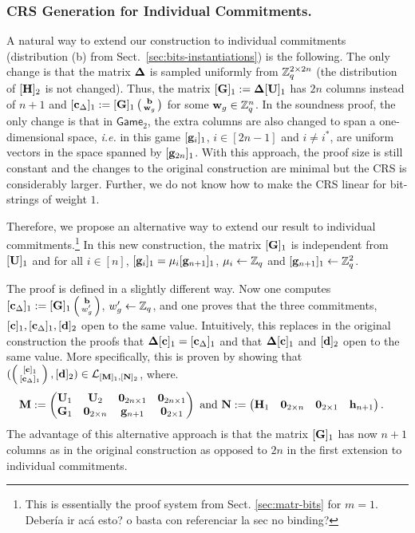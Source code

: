 \subsubsection{CRS Generation for Individual Commitments.}
A natural way to extend our construction to individual commitments (distribution (b) from Sect.\ \ref{sec:bits-instantiations}) is the following. The only change is that the matrix $\mathbf{{\Delta}}$ is sampled uniformly from  $\mathbb{Z}_q^{2 \times 2n}$ (the distribution of $[{\mathbf{{H}}}]_2$ is not changed). Thus, the matrix 
$[\mathbf{{G}}]_1:=\mathbf{{\Delta}} [\mathbf{{U}}]_1$ has $2n$ columns instead of $n+1$ and 
$[\mathbf{c}_{\Delta}]_1 := [\mathbf{{G}}]_1 \left(\begin{smallmatrix}\mathbf{b} \\ \mathbf{w}_g\end{smallmatrix}\right)$ for some $\mathbf{w}_g \in \mathbb{Z}_q^{n}$.   
In the soundness proof, the only change is that in $\mathsf{Game}_2$, the extra columns are also changed to span a one-dimensional space, \textit{i.e.} in this game $[\mathbf{g}_{i}]_1$, $i \in [2n-1]$ and $i \neq i^*$, are uniform vectors in the space spanned by $[\mathbf{g}_{2n}]_1$.
With this approach, the proof size is still constant and the changes to the original construction are minimal but the CRS is considerably larger. Further, we do not know how to make the CRS linear for bit-strings of weight $1$. 

Therefore, we propose an alternative way to extend our result to individual commitments.\footnote{This is essentially the proof system from Sect. \ref{sec:matr-bits} for $m=1$. {\color{red} Deber\'ia ir ac\'a esto? o basta con referenciar la sec no binding?}} In this new construction, the matrix $[\mathbf{{G}}]_1$ is independent from $[\mathbf{{U}}]_1$ and for all $i \in [n]$, $[\mathbf{g}_{i}]_1 = \mu_i [\mathbf{g}_{n+1}]_1$, $\mu_i \gets \mathbb{Z}_q$ and   $[\mathbf{g}_{n+1}]_1\gets\mathbb{Z}_q^2$. 

The proof is defined in a slightly different way. Now one computes $[\mathbf{c}_\Delta]_1:=[\mathbf{{G}}]_1\left(\begin{smallmatrix}\mathbf{b}\\w'_g\end{smallmatrix}\right)$, $w'_g\gets\mathbb{Z}_q$, and one proves that the three commitments, $[\mathbf{c}]_1,[\mathbf{c}_\Delta]_1,[\mathbf{d}]_2$ open to the same value.  Intuitively, this replaces in the original construction the proofs that $\mathbf{{\Delta}}[\mathbf{c}]_1=[\mathbf{c}_\Delta]_1$ and that $\mathbf{{\Delta}}[\mathbf{c}]_1$ and $[\mathbf{d}]_2$ open to the same value. More specifically, this is proven by showing that $(\left(\begin{smallmatrix}{[\mathbf{c}]_1}\\{[\mathbf{c}_\Delta]_1}\end{smallmatrix}\right), [\mathbf{d}]_2)\in\mathcal{L}_{[\mathbf{{M}}]_1,[\mathbf{{N}}]_2}$, where.
\begin{align*}
&\mathbf{{M}} := 
\left(\begin{matrix}
    \mathbf{{U}}_1 & \mathbf{{U}}_2           & \mathbf{{0}}_{2n\times 1} & \mathbf{{0}}_{2n\times 1}\\
    \mathbf{G}_1      & \mathbf{{0}}_{2\times n} & \mathbf{g}_{n+1}             & \mathbf{{0}}_{2\times 1}\\
\end{matrix}\right)
\text{ and }
\mathbf{{N}} :=
\left(\begin{matrix}
    \mathbf{H}_1      & \mathbf{{0}}_{2\times n} & \mathbf{{0}}_{2\times 1}  & \mathbf{h}_{n+1}
\end{matrix}\right).
\end{align*}
The advantage of this alternative approach is that the matrix $[\mathbf{{G}}]_1$ has now $n+1$ columns as in the original construction as opposed to $2n$ in the first extension to individual commitments.  


